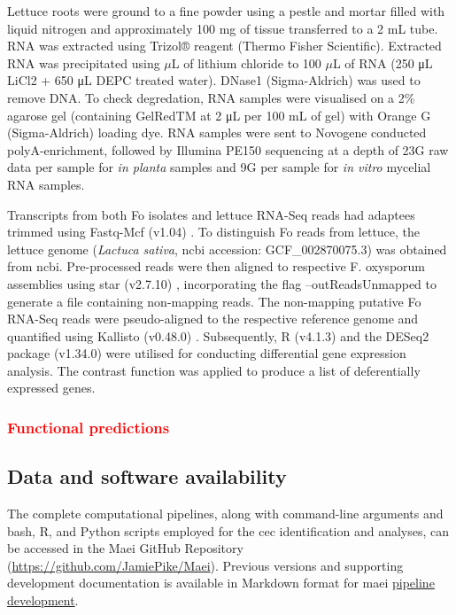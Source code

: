 Lettuce roots were ground to a fine powder using a pestle and mortar filled with liquid nitrogen and approximately 100 mg of tissue transferred to a 2 mL tube. RNA was extracted using Trizol® reagent (Thermo Fisher Scientific). Extracted RNA was precipitated using \(\mu\)L of lithium chloride to 100 \(\mu\)L of RNA (250 μL LiCl2 + 650 μL DEPC treated water). DNase1 (Sigma-Aldrich) was used to remove DNA. To check degredation, RNA samples were visualised on a 2\% agarose gel (containing GelRedTM at 2 μL per 100 mL of gel) with Orange G (Sigma-Aldrich) loading dye. RNA samples were sent to  Novogene conducted polyA-enrichment, followed by Illumina PE150 sequencing at a depth of 23G raw data per sample for \textit{in planta} samples and 9G per sample for \textit{in vitro} mycelial RNA samples.

Transcripts from both \ac{Fo} isolates and lettuce RNA-Seq reads had  adaptees trimmed using Fastq-Mcf (v1.04) \parencite{Aronesty2013}. To distinguish \ac{Fo} reads from lettuce, the lettuce genome (\textit{Lactuca sativa}, \ac{ncbi} accession: GCF\_002870075.3) was obtained from \ac{ncbi}. Pre-processed reads were then aligned to respective F. oxysporum assemblies using \ac{star} (v2.7.10) \parencite{Dobin2013}, incorporating the flag --outReadsUnmapped to generate a file containing non-mapping reads. The non-mapping putative \ac{Fo} RNA-Seq reads were pseudo-aligned to the respective reference genome and quantified using Kallisto (v0.48.0) \parencite{Bray2016}. Subsequently, R (v4.1.3) \parencite{R} and the DESeq2 package (v1.34.0) \parencite{Love2014} were utilised for conducting differential gene expression analysis. The contrast function was applied to produce a list of deferentially expressed genes.

\subsubsection{\textcolor{red}{Functional predictions}}

\subsection{Data and software availability}

The complete computational pipelines, along with command-line arguments and bash, R, and Python scripts employed for the \ac{cec} identification and analyses, can be accessed in the Maei GitHub Repository (\href{https://github.com/JamiePike/Maei}{https://github.com/JamiePike/Maei}). Previous versions and supporting development documentation is available in Markdown format for \ac{maei} \href{https://github.com/JamiePike/Maei/tree/main/dev}{pipeline development}.

